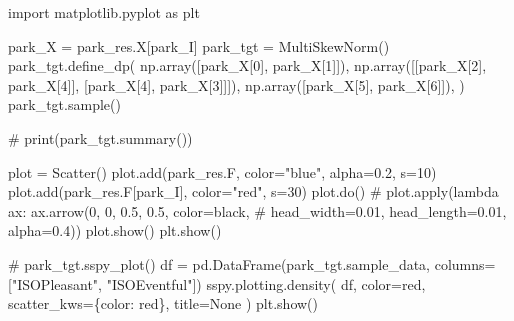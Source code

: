 \documentclass[
  letterpaper,
  DIV=11,
  numbers=noendperiod]{scrartcl}
\newenvironment{Shaded}{\begin{snugshade}}{\end{snugshade}}
\newcommand{\CommentTok}[1]{\textcolor[rgb]{0.37,0.37,0.37}{#1}}
\newcommand{\DecValTok}[1]{\textcolor[rgb]{0.68,0.00,0.00}{#1}}
\newcommand{\FloatTok}[1]{\textcolor[rgb]{0.68,0.00,0.00}{#1}}
\newcommand{\ImportTok}[1]{\textcolor[rgb]{0.00,0.46,0.62}{#1}}
\newcommand{\NormalTok}[1]{\textcolor[rgb]{0.00,0.23,0.31}{#1}}
\newcommand{\OperatorTok}[1]{\textcolor[rgb]{0.37,0.37,0.37}{#1}}
\newcommand{\StringTok}[1]{\textcolor[rgb]{0.13,0.47,0.30}{#1}}
\newcommand{\VariableTok}[1]{\textcolor[rgb]{0.07,0.07,0.07}{#1}}
\begin{document}
\begin{Shaded}
\begin{Highlighting}[]
\ImportTok{import}\NormalTok{ matplotlib.pyplot }\ImportTok{as}\NormalTok{ plt}

\NormalTok{park\_X }\OperatorTok{=}\NormalTok{ park\_res.X[park\_I]}
\NormalTok{park\_tgt }\OperatorTok{=}\NormalTok{ MultiSkewNorm()}
\NormalTok{park\_tgt.define\_dp(}
\NormalTok{    np.array([park\_X[}\DecValTok{0}\NormalTok{], park\_X[}\DecValTok{1}\NormalTok{]]),}
\NormalTok{    np.array([[park\_X[}\DecValTok{2}\NormalTok{], park\_X[}\DecValTok{4}\NormalTok{]], [park\_X[}\DecValTok{4}\NormalTok{], park\_X[}\DecValTok{3}\NormalTok{]]]),}
\NormalTok{    np.array([park\_X[}\DecValTok{5}\NormalTok{], park\_X[}\DecValTok{6}\NormalTok{]]),}
\NormalTok{)}
\NormalTok{park\_tgt.sample()}

\CommentTok{\# print(park\_tgt.summary())}

\NormalTok{plot }\OperatorTok{=}\NormalTok{ Scatter()}
\NormalTok{plot.add(park\_res.F, color}\OperatorTok{=}\StringTok{"blue"}\NormalTok{, alpha}\OperatorTok{=}\FloatTok{0.2}\NormalTok{, s}\OperatorTok{=}\DecValTok{10}\NormalTok{)}
\NormalTok{plot.add(park\_res.F[park\_I], color}\OperatorTok{=}\StringTok{"red"}\NormalTok{, s}\OperatorTok{=}\DecValTok{30}\NormalTok{)}
\NormalTok{plot.do()}
\CommentTok{\# plot.apply(lambda ax: ax.arrow(0, 0, 0.5, 0.5, color=\textquotesingle{}black\textquotesingle{},}
\CommentTok{\#                                head\_width=0.01, head\_length=0.01, alpha=0.4))}
\NormalTok{plot.show()}
\NormalTok{plt.show()}



\CommentTok{\# park\_tgt.sspy\_plot()}
\NormalTok{df }\OperatorTok{=}\NormalTok{ pd.DataFrame(park\_tgt.sample\_data, columns}\OperatorTok{=}\NormalTok{[}\StringTok{"ISOPleasant"}\NormalTok{, }\StringTok{"ISOEventful"}\NormalTok{])}
\NormalTok{sspy.plotting.density(}
\NormalTok{    df, color}\OperatorTok{=}\StringTok{\textquotesingle{}red\textquotesingle{}}\NormalTok{, scatter\_kws}\OperatorTok{=}\NormalTok{\{}\StringTok{\textquotesingle{}color\textquotesingle{}}\NormalTok{: }\StringTok{\textquotesingle{}red\textquotesingle{}}\NormalTok{\}, title}\OperatorTok{=}\VariableTok{None}
\NormalTok{)}
\NormalTok{plt.show()}
\end{Highlighting}
\end{Shaded}
\end{document}
